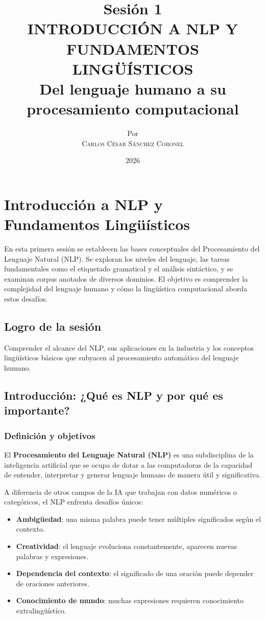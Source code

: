 \documentclass[12pt,a4paper,openany,oneside]{book}
\title{
    \textbf{Sesión 1} \\ 
    \Huge \textbf{INTRODUCCIÓN A NLP Y FUNDAMENTOS LINGÜÍSTICOS} \\
    \Large Del lenguaje humano a su procesamiento computacional
}
\author{
    \small Por \\ \vspace{0.2cm}
    \Large \textsc{Carlos César Sánchez Coronel}
}
\date{2026}
\begin{document}
\maketitle
\tableofcontents
{}

\chapter{Introducción a NLP y Fundamentos Lingüísticos}

En esta primera sesión se establecen las bases conceptuales del Procesamiento del Lenguaje Natural (NLP). Se exploran los niveles del lenguaje, las tareas fundamentales como el etiquetado gramatical y el análisis sintáctico, y se examinan corpus anotados de diversos dominios. El objetivo es comprender la complejidad del lenguaje humano y cómo la lingüística computacional aborda estos desafíos.

\section{Logro de la sesión}
Comprender el alcance del NLP, sus aplicaciones en la industria y los conceptos lingüísticos básicos que subyacen al procesamiento automático del lenguaje humano.

\section{Introducción: ¿Qué es NLP y por qué es importante?}

\subsection{Definición y objetivos}
El \textbf{Procesamiento del Lenguaje Natural (NLP)} es una subdisciplina de la inteligencia artificial que se ocupa de dotar a las computadoras de la capacidad de entender, interpretar y generar lenguaje humano de manera útil y significativa.

A diferencia de otros campos de la IA que trabajan con datos numéricos o categóricos, el NLP enfrenta desafíos únicos:
\begin{itemize}
    \item \textbf{Ambigüedad}: una misma palabra puede tener múltiples significados según el contexto.
    \item \textbf{Creatividad}: el lenguaje evoluciona constantemente, aparecen nuevas palabras y expresiones.
    \item \textbf{Dependencia del contexto}: el significado de una oración puede depender de oraciones anteriores.
    \item \textbf{Conocimiento de mundo}: muchas expresiones requieren conocimiento extralingüístico.
\end{itemize}
\end{document}
